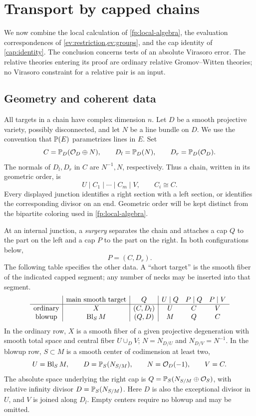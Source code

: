 \section{Transport by capped chains}\label{sew:section}

We now combine the local calculation of \cref{fp:local-algebra}, the
evaluation correspondences of \cref{ev:restriction,ev:groups}, and the cap
identity of \cref{cap:identity}.  The conclusion concerns tests of an
absolute Virasoro error.  The relative theories entering its proof are
ordinary relative Gromov--Witten theories; no Virasoro constraint for a
relative pair is an input.

\subsection{Geometry and coherent data}

\begin{notation}\label{sew:configurations}
All targets in a chain have complex dimension $n$.  Let $D$ be a smooth
projective variety, possibly disconnected, and let $N$ be a line bundle
on $D$.  We use the convention that $\mathbb P(E)$ parametrizes lines in $E$.
Set
\[
 C=\mathbb P_D(\mathcal O_D\oplus N),\qquad
 D_l=\mathbb P_D(N),\qquad D_r=\mathbb P_D(\mathcal O_D).
\]
The normals of $D_l,D_r$ in $C$ are $N^{-1},N$, respectively.  Thus a
chain, written in its geometric order, is
\begin{equation}\label{sew:chain}
 U\mid C_1\mid\cdots\mid C_m\mid V,
 \qquad C_i\cong C.
\end{equation}
Every displayed junction identifies a right section with a left section,
or identifies the corresponding divisor on an end.  Geometric order
will be kept distinct from the bipartite coloring used in
\cref{fp:local-algebra}.

At an internal junction, a \emph{surgery} separates the chain and
attaches a cap $Q$ to the part on the left and a cap $P$ to the part on
the right.  In both configurations below,
\[
 P=(C,D_r).
\]
The following table specifies the other data.  A ``short target'' is
the smooth fiber of the indicated capped segment; any number of necks
may be inserted into that segment.
\[
\begin{array}{c|c|c|ccc}
 &\text{main smooth target}&Q& U\mid Q&P\mid Q&P\mid V\\ \hline
 \text{ordinary}&X&(C,D_l)&U&C&V\\
 \text{blowup}&\operatorname{Bl}_S M&(Q,D)&M&Q&C
\end{array}
\]
In the ordinary row, $X$ is a smooth fiber of a given projective
degeneration with smooth total space and central fiber $U\cup_D V$;
$N=N_{D/U}$ and $N_{D/V}=N^{-1}$.  In the blowup row, $S\subset M$ is a
smooth center of codimension at least two,
\[
 U=\operatorname{Bl}_S M,\qquad D=\mathbb P_S(N_{S/M}),\qquad
 N=\mathcal O_D(-1),\qquad V=C.
\]
The absolute space underlying the right cap is
$Q=\mathbb P_S(N_{S/M}\oplus\mathcal O_S)$, with relative infinity divisor
$D=\mathbb P_S(N_{S/M})$.  Here $D$ is also the exceptional divisor in $U$,
and $V$ is joined along $D_l$.  Empty centers require no blowup and may
be omitted.
\end{notation}

